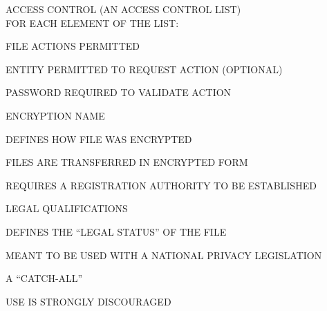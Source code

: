 \begin{bwslide}

\begin{nrtc}
\item	ACCESS CONTROL (AN ACCESS CONTROL LIST)\\
	FOR EACH ELEMENT OF THE LIST:
    \begin{nrtc}
    \item	FILE ACTIONS PERMITTED

    \item	ENTITY PERMITTED TO REQUEST ACTION (OPTIONAL)

    \item	PASSWORD REQUIRED TO VALIDATE ACTION
    \end{nrtc}

\item	ENCRYPTION NAME
    \begin{nrtc}
    \item	DEFINES HOW FILE WAS ENCRYPTED

    \item	FILES ARE TRANSFERRED IN ENCRYPTED FORM

    \item	REQUIRES A REGISTRATION AUTHORITY TO BE ESTABLISHED
    \end{nrtc}

\item	LEGAL QUALIFICATIONS
    \begin{nrtc}
    \item	DEFINES THE ``LEGAL STATUS'' OF THE FILE

    \item	MEANT TO BE USED WITH A NATIONAL PRIVACY LEGISLATION
    \end{nrtc}
\end{nrtc}
\end{bwslide}


\begin{bwslide}

\begin{nrtc}
\item	A ``CATCH-ALL''

\item	USE IS STRONGLY DISCOURAGED
\end{nrtc}
\end{bwslide}


